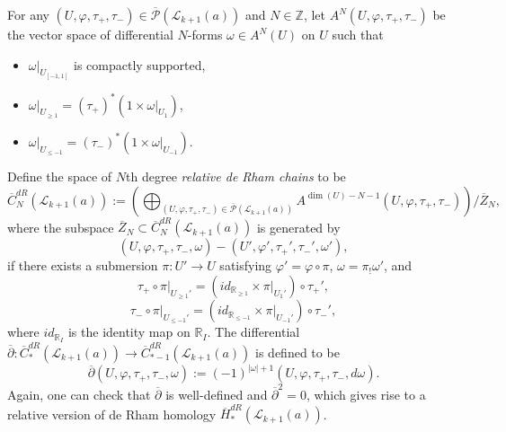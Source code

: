 \documentclass[a4paper]{article}
\numberwithin{equation}{section}
\begin{document}
For any $(U,\varphi,\tau_+,\tau_-)\in\overline{\mathcal{P}}(\mathcal{L}_{k+1}(a))$ and $N\in\mathbb{Z}$, let $A^N(U,\varphi,\tau_+,\tau_-)$ be the vector space of differential $N$-forms $\omega\in A^N(U)$ on $U$ such that
\begin{itemize}
	\item $\omega|_{U_{[-1,1]}}$ is compactly supported,
	\item $\omega|_{U_{\geq1}}=(\tau_+)^\ast(1\times\omega|_{U_1})$,
	\item $\omega|_{U_{\leq-1}}=(\tau_-)^\ast(1\times\omega|_{U_{-1}})$.
\end{itemize}
Define the space of $N$th degree \textit{relative de Rham chains} to be
\begin{equation}
\overline{C}_N^\mathit{dR}(\mathcal{L}_{k+1}(a)):=\left(\bigoplus_{(U,\varphi,\tau_+,\tau_-)\in\overline{\mathcal{P}}(\mathcal{L}_{k+1}(a))}A^{\dim(U)-N-1}(U,\varphi,\tau_+,\tau_-)\right)/\overline{Z}_N,
\end{equation}
where the subspace $\overline{Z}_N\subset\overline{C}_N^\mathit{dR}(\mathcal{L}_{k+1}(a))$ is generated by
\begin{equation}
(U,\varphi,\tau_+,\tau_-,\omega)-(U',\varphi',\tau_+',\tau_-',\omega'),
\end{equation}
if there exists a submersion $\pi:U'\rightarrow U$ satisfying $\varphi'=\varphi\circ\pi$, $\omega=\pi_!\omega'$, and
\begin{equation}
\tau_+\circ\pi|_{U_{\geq1}'}=(\mathit{id}_{\mathbb{R}_{\geq1}}\times\pi|_{U_1'})\circ\tau_+',
\end{equation}
\begin{equation}
\tau_-\circ\pi|_{U_{\leq-1}'}=(\mathit{id}_{\mathbb{R}_{\leq-1}}\times\pi|_{U_{-1}'})\circ\tau_-',
\end{equation}
where $\mathit{id}_{\mathbb{R}_I}$ is the identity map on $\mathbb{R}_I$. The differential $\overline{\partial}:\overline{C}_\ast^\mathit{dR}(\mathcal{L}_{k+1}(a))\rightarrow\overline{C}_{\ast-1}^\mathit{dR}(\mathcal{L}_{k+1}(a))$ is defined to be
\begin{equation}
\overline{\partial}(U,\varphi,\tau_+,\tau_-,\omega):=(-1)^{|\omega|+1}(U,\varphi,\tau_+,\tau_-,d\omega).
\end{equation}
Again, one can check that $\overline{\partial}$ is well-defined and $\overline{\partial}^2=0$, which gives rise to a relative version of de Rham homology $\overline{H}_\ast^\mathit{dR}(\mathcal{L}_{k+1}(a))$.
\end{document}
